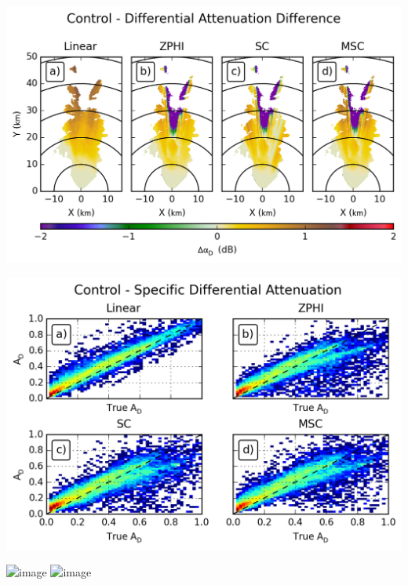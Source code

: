 \documentclass[red]{beamer}
\begin{document}
\begin{frame}
    \begin{center}
        \includegraphics[scale=0.7]{figures/X_Control_Differential_Attenuation_Difference}
    \end{center}
\end{frame}

\begin{frame}
    \begin{center}
        \includegraphics[scale=0.7]{figures/X_Control_Specific_Differential_Attenuation_scatter}
    \end{center}
\end{frame}

\begin{frame}
    \begin{center}
        \includegraphics<1>[scale=0.7]{figures/C_Canting_Attenuation_H}
        \includegraphics<2>[scale=0.7]{figures/C_Control_Attenuation_H}
    \end{center}
\end{frame}
\end{document}
